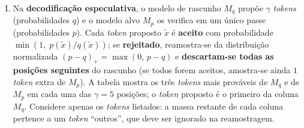 \documentclass{dlproblemset}
\begin{document}
\begin{enumerate}[I)]
\textbf{I.} Uma sequência de $n{+}1$ \textit{tokens} fornece $n$ exemplos de treino simultâneos: a perda é computada para todas as posições em um único passe, com alvo igual à entrada deslocada uma posição (\textit{shift-by-one}).

\textbf{II.} A máscara causal é necessária apenas na inferência; durante o treinamento ela pode ser omitida sem prejuízo, pois os alvos de cada posição já são conhecidos.

\textbf{III.} Em RNNs o mesmo paralelismo entre posições não é possível, pois o estado oculto de cada posição depende do estado da posição anterior, forçando o processamento \textit{token} a \textit{token}.

\begin{enumerate}[a)]
    \item Apenas I está correta.
    \item Apenas II está correta.
    \item Apenas III está correta.
    \item Apenas I e II estão corretas.
    \item Apenas II e III estão corretas.
    \item Apenas I e III estão corretas.
    \item Todas estão corretas.
    \item Nenhuma está correta.
\end{enumerate}

\item Na \textbf{decodificação especulativa}, o modelo de rascunho $M_q$ propõe $\gamma$ \textit{tokens} (probabilidades $q$) e o modelo alvo $M_p$ os verifica em um único passe (probabilidades $p$). Cada \textit{token} proposto $\tilde{x}$ é \textbf{aceito} com probabilidade $\min\!\left(1,\; p(\tilde{x})/q(\tilde{x})\right)$; se \textbf{rejeitado}, reamostra-se da distribuição normalizada $(p - q)_+ = \max(0,\, p - q)$ e \textbf{descartam-se todas as posições seguintes} do rascunho (se todos forem aceitos, amostra-se ainda $1$ \textit{token} extra de $M_p$). A tabela mostra os três \textit{tokens} mais prováveis de $M_q$ e de $M_p$ em cada uma das $\gamma = 5$ posições; o \textit{token} proposto é o primeiro da coluna $M_q$. Considere apenas os \textit{tokens} listados: a massa restante de cada coluna pertence a um \textit{token} ``outros'', que deve ser ignorado na reamostragem.


\end{enumerate}
\end{document}
